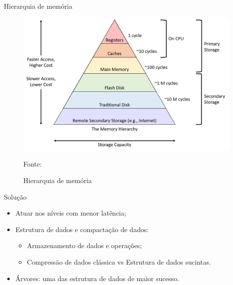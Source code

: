 \begin{frame}{Hierarquia de memória}
	\begin{figure}[h!]
        \centering
        \includegraphics[scale=0.3]{images/hierarquia-memory-2.png}
        
        \caption{Hierarquia de memória}
        \footnotesize{Fonte: \cite{memory-hierarchy}}
    \end{figure} 
\end{frame}

\begin{frame}{Solução}
    \begin{itemize}
        \item Atuar nos níveis com menor latência;
        \item Estrutura de dados e compactação de dados:
        \begin{itemize}
            \item Armazenamento de dados e operações;
            \item Compressão de dados clássica vs Estrutura de dados sucintas.
        \end{itemize}
        \item Árvores: uma das estrutura de dados de maior sucesso.
    \end{itemize}
\end{frame}